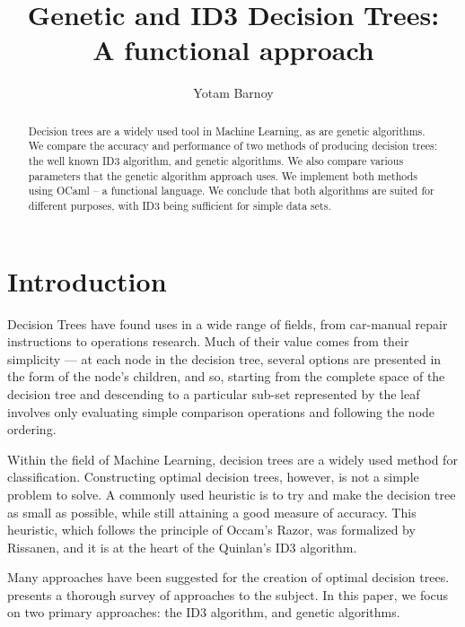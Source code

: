 \documentclass[12pt, letterpaper]{article}
\title{Genetic and ID3 Decision Trees:\\ A functional approach}
\author{Yotam Barnoy}
\begin{document}
\maketitle

\begin{abstract}
Decision trees are a widely used tool in Machine Learning, as are genetic algorithms. We compare the accuracy and performance of two methods of producing decision trees: the well known ID3 algorithm, and genetic algorithms. We also compare various parameters that the genetic algorithm approach uses. We implement both methods using OCaml -- a functional language. We conclude that both algorithms are suited for different purposes, with ID3 being sufficient for simple data sets.

\end{abstract}

\section{Introduction}
Decision Trees have found uses in a wide range of fields, from car-manual repair instructions to operations research. Much of their value comes from their simplicity --- at each node in the decision tree, several options are presented in the form of the node's children, and so, starting from the complete space of the decision tree and descending to a particular sub-set represented by the leaf involves only evaluating simple comparison operations and following the node ordering.

Within the field of Machine Learning, decision trees are a widely used method for classification\cite{tomMitchellML}. Constructing optimal decision trees, however, is not a simple problem to solve\cite{decisionTreesNPComplete}. A commonly used heuristic is to try and make the decision tree as small as possible, while still attaining a good measure of accuracy. This heuristic, which follows the principle of Occam's Razor, was formalized by Rissanen\cite{rissanen1978modeling}, and it is at the heart of the Quinlan's ID3 algorithm\cite{quinlan1986induction}.

Many approaches have been suggested for the creation of optimal decision trees. \cite{safavian1991survey} presents a thorough survey of approaches to the subject. In this paper, we focus on two primary approaches: the ID3 algorithm, and genetic algorithms.
\end{document}
